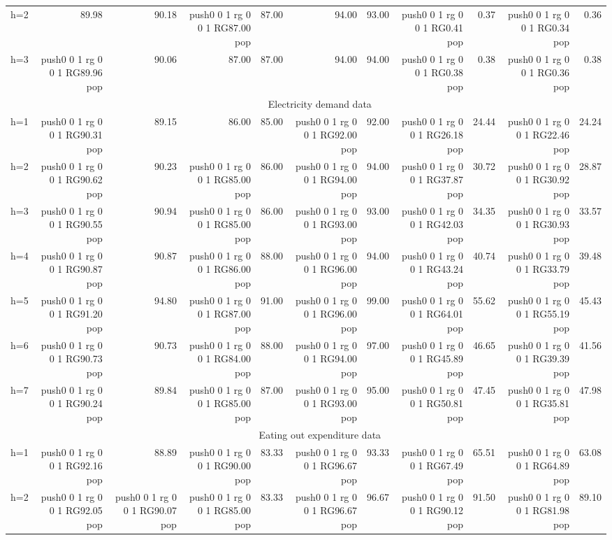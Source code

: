 \documentclass[
  american,
  12pt]{article}
\theoremstyle{plain}
\theoremstyle{plain}
\theoremstyle{remark}
\newcommand{\CPTSadd}[1]{\ifmmode\else\leavevmode\fi\pdfcolorstack 0 push{0 0 1 rg 0 0 1 RG}#1\pdfcolorstack 0 pop}
\begin{document}
\begin{table}
{{\begin{tabular}{lrrrrrrrrrr}
h=2  & 89.98 & 90.18 & \CPTSadd{87.00} & 87.00 & 94.00 & 93.00 & \CPTSadd{0.41} & 0.37 & \CPTSadd{0.34} & 0.36 \\
h=3  & \CPTSadd{89.96} & 90.06 & 87.00 & 87.00 & 94.00 & 94.00 & \CPTSadd{0.38} & 0.38 & \CPTSadd{0.36} & 0.38 \\
\cmidrule(l{3pt}r{3pt}){2-11}
     & \multicolumn{10}{c}{Electricity demand data}                                                                                                                                                                                                                                     \\[0.3em]
h=1  & \CPTSadd{90.31} & 89.15 & 86.00 & 85.00 & \CPTSadd{92.00} & 92.00 & \CPTSadd{26.18} & 24.44 & \CPTSadd{22.46} & 24.24 \\
h=2  & \CPTSadd{90.62} & 90.23 & \CPTSadd{85.00} & 86.00 & \CPTSadd{94.00} & 94.00 & \CPTSadd{37.87} & 30.72 & \CPTSadd{30.92} & 28.87 \\
h=3  & \CPTSadd{90.55} & 90.94 & \CPTSadd{85.00} & 86.00 & \CPTSadd{93.00} & 93.00 & \CPTSadd{42.03} & 34.35 & \CPTSadd{30.93} & 33.57 \\
h=4  & \CPTSadd{90.87} & 90.87 & \CPTSadd{86.00} & 88.00 & \CPTSadd{96.00} & 94.00 & \CPTSadd{43.24} & 40.74 & \CPTSadd{33.79} & 39.48 \\
h=5  & \CPTSadd{91.20} & 94.80 & \CPTSadd{87.00} & 91.00 & \CPTSadd{96.00} & 99.00 & \CPTSadd{64.01} & 55.62 & \CPTSadd{55.19} & 45.43 \\
h=6  & \CPTSadd{90.73} & 90.73 & \CPTSadd{84.00} & 88.00 & \CPTSadd{94.00} & 97.00 & \CPTSadd{45.89} & 46.65 & \CPTSadd{39.39} & 41.56 \\
h=7  & \CPTSadd{90.24} & 89.84 & \CPTSadd{85.00} & 87.00 & \CPTSadd{93.00} & 95.00 & \CPTSadd{50.81} & 47.45 & \CPTSadd{35.81} & 47.98 \\
\cmidrule(l{3pt}r{3pt}){2-11}
     & \multicolumn{10}{c}{Eating out expenditure data}                                                                                                                                                                                                                                 \\[0.3em]
h=1  & \CPTSadd{92.16} & 88.89 & \CPTSadd{90.00} & 83.33 & \CPTSadd{96.67} & 93.33 & \CPTSadd{67.49} & 65.51 & \CPTSadd{64.89} & 63.08 \\
h=2  & \CPTSadd{92.05} & \CPTSadd{90.07} & \CPTSadd{85.00} & 83.33 & \CPTSadd{96.67} & 96.67 & \CPTSadd{90.12} & 91.50 & \CPTSadd{81.98} & 89.10 \\

\end{tabular}}}
\end{table}
\end{document}
